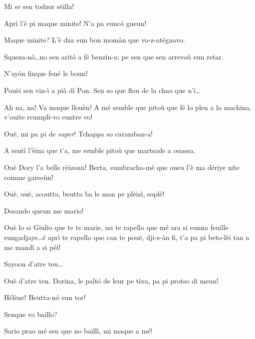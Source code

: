 \begin{drama}
\Marcospeaks Mi se sen todzor séilla! 

\Michelspeaks Aprì l'è pi maque minite! N'a pa eunc\'o gneun!

\Bertaspeaks Maque minite? L'è dza eun bon momàn que vo-z-atégnavo.

\Federicospeaks{} Squeza-n\'o\ldots no sen arit\'o a fé benzin-a; pe sen que sen arrevoù eun retar.

\Marcospeaks N'ay\'on finque fené le boun!

\Michelspeaks Pouèi sen vin-ì a pià di Pon.  Sen so que flou de la chao que n'i\ldots


\Dorinaspeaks Ah na, na! Va maque llouèn! A mé semble que pitoù que fé lo plen a la machina, v'ouite reumpli-vo euntre vo!

\Federicospeaks Ouè, mi pa pi de \textit{super}!  Tchap\-pa so caramban-a!

\Dorinaspeaks A sentì l’èina que t’a, me semble pitoù que martsade a ouassa.


\Giuliospeaks Ouè Dory l’a belle rèizoun! Berta, eum\-bra\-cha-mé que oueu l’è ma dériye nite comme garsoùn!

\Bertaspeaks{} Ouè, ouè, acoutta, beut\-ta ba le man pe plèizì, soplé!


\Giuliospeaks{} Desando queun me mario!

\Bertaspeaks{} Ouè lo si Giulio que te te marie, mi te rapello que mé ara si eunna feuille eungadjaye\ldots é aprì te rapello que can te pouè, dji-z-àn fi, t'a pa pi beto-lèi tan a me mandì a si péì!

\Giuliospeaks Sayoon d'atre ten\ldots

\Bertaspeaks{} Ouè d'atre ten.  Dorina, le palt\'o de leur pe tèra, pa pi protso di meun!

\Marcospeaks Hélène! Beutta-n\'o eun tor!

\Helenespeaks Senque vo baillo?

\Federicospeaks{} Sario prao mé sen que no baillì, mi maque a mé! 


\end{drama}
